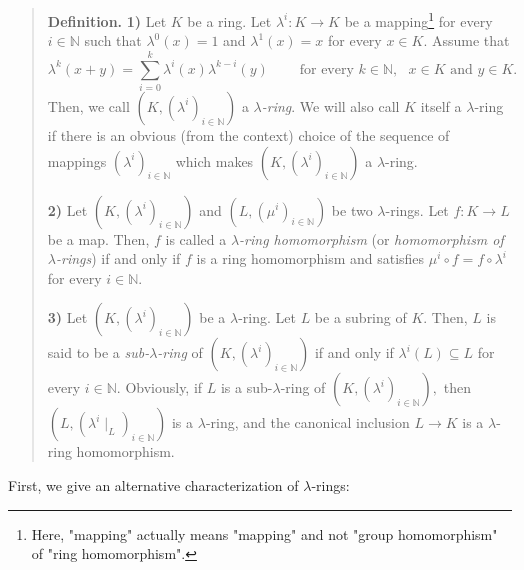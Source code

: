 \documentclass[12pt,final,notitlepage,onecolumn,german]{article}%
\begin{document}
\begin{quote}
\textbf{Definition.} \textbf{1)} Let $K$ be a ring. Let $\lambda
^{i}:K\rightarrow K$ be a mapping\footnote{Here, "mapping" actually means
"mapping" and not "group homomorphism" of "ring homomorphism".} for every
$i\in\mathbb{N}$ such that $\lambda^{0}\left(  x\right)  =1$ and $\lambda
^{1}\left(  x\right)  =x$ for every $x\in K$. Assume that%
\begin{equation}
\lambda^{k}\left(  x+y\right)  =\sum_{i=0}^{k}\lambda^{i}\left(  x\right)
\lambda^{k-i}\left(  y\right)  \ \ \ \ \ \ \ \ \ \ \text{for every }%
k\in\mathbb{N},\text{ }x\in K\text{ and }y\in K. \label{lambda1}%
\end{equation}
Then, we call $\left(  K,\left(  \lambda^{i}\right)  _{i\in\mathbb{N}}\right)
$ a $\lambda$\textit{-ring}. We will also call $K$ itself a $\lambda$-ring if
there is an obvious (from the context) choice of the sequence of mappings
$\left(  \lambda^{i}\right)  _{i\in\mathbb{N}}$ which makes $\left(  K,\left(
\lambda^{i}\right)  _{i\in\mathbb{N}}\right)  $ a $\lambda$-ring.

\textbf{2)} Let $\left(  K,\left(  \lambda^{i}\right)  _{i\in\mathbb{N}%
}\right)  $ and $\left(  L,\left(  \mu^{i}\right)  _{i\in\mathbb{N}}\right)  $
be two $\lambda$-rings. Let $f:K\rightarrow L$ be a map. Then, $f$ is called a
$\lambda$\textit{-ring homomorphism} (or \textit{homomorphism of }$\lambda
$\textit{-rings}) if and only if $f$ is a ring homomorphism and satisfies
$\mu^{i}\circ f=f\circ\lambda^{i}$ for every $i\in\mathbb{N}$.

\textbf{3)} Let $\left(  K,\left(  \lambda^{i}\right)  _{i\in\mathbb{N}%
}\right)  $ be a $\lambda$-ring. Let $L$ be a subring of $K$. Then, $L$ is
said to be a \textit{sub-}$\lambda$\textit{-ring} of $\left(  K,\left(
\lambda^{i}\right)  _{i\in\mathbb{N}}\right)  $ if and only if $\lambda
^{i}\left(  L\right)  \subseteq L$ for every $i\in\mathbb{N}$. Obviously, if
$L$ is a sub-$\lambda$-ring of $\left(  K,\left(  \lambda^{i}\right)
_{i\in\mathbb{N}}\right)  ,$ then $\left(  L,\left(  \lambda^{i}\mid
_{L}\right)  _{i\in\mathbb{N}}\right)  $ is a $\lambda$-ring, and the
canonical inclusion $L\rightarrow K$ is a $\lambda$-ring homomorphism.
\end{quote}

First, we give an alternative characterization of $\lambda$-rings:
\end{document}
